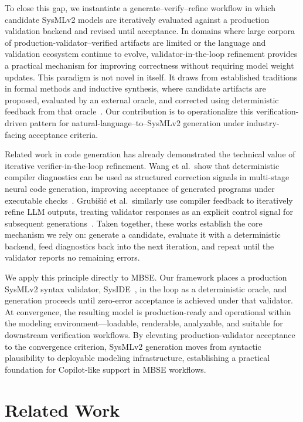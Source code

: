 \documentclass[colorlinks,upint,subscriptcorrection,varvw,hyphenate,balance]{asmeconf} %
\begin{document}
To close this gap, we instantiate a generate--verify--refine workflow in which candidate SysMLv2 models are iteratively evaluated against a production validation backend and revised until acceptance. In domains where large corpora of production-validator--verified artifacts are limited or the language and validation ecosystem continue to evolve, validator-in-the-loop refinement provides a practical mechanism for improving correctness without requiring model weight updates. This paradigm is not novel in itself. It draws from established traditions in formal methods and inductive synthesis, where candidate artifacts are proposed, evaluated by an external oracle, and corrected using deterministic feedback from that oracle~\cite{clarke2000cegar,solarlezama2008thesis,jha2010ogis,alur2013sygus}. Our contribution is to operationalize this verification-driven pattern for natural-language--to--SysMLv2 generation under industry-facing acceptance criteria.

Related work in code generation has already demonstrated the technical value of iterative verifier-in-the-loop refinement. Wang et al.\ show that deterministic compiler diagnostics can be used as structured correction signals in multi-stage neural code generation, improving acceptance of generated programs under executable checks~\cite{wang2022compilable}. Grubi{\v{s}}i{\'c} et al.\ similarly use compiler feedback to iteratively refine LLM outputs, treating validator responses as an explicit control signal for subsequent generations~\cite{grubisic2024compiler}. Taken together, these works establish the core mechanism we rely on: generate a candidate, evaluate it with a deterministic backend, feed diagnostics back into the next iteration, and repeat until the validator reports no remaining errors.

We apply this principle directly to MBSE. Our framework places a production SysMLv2 syntax validator, SysIDE~\cite{sensmetry2024syside}, in the loop as a deterministic oracle, and generation proceeds until zero-error acceptance is achieved under that validator. At convergence, the resulting model is production-ready and operational within the modeling environment---loadable, renderable, analyzable, and suitable for downstream verification workflows. By elevating production-validator acceptance to the convergence criterion, SysMLv2 generation moves from syntactic plausibility to deployable modeling infrastructure, establishing a practical foundation for Copilot-like support in MBSE workflows.

\section{Related Work}
\end{document}
